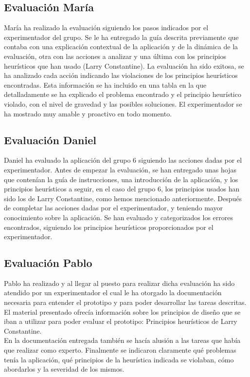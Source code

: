 \subsection{Evaluación María}
María ha realizado la evaluación siguiendo los pasos indicados por el experimentador del grupo. Se le ha entregado la guía descrita previamente que contaba con 
una explicación contextual de la aplicación y de la dinámica de la evaluación, otra con las acciones a analizar y una última con los principios heurísticos que han 
usado (Larry Constantine). La evaluación ha sido exitosa, se ha analizado cada acción indicando las violaciones de los principios heurísticos encontradas. 
Esta información se ha incluido en una tabla en la que detalladamente se ha explicado el problema encontrado y el principio heurístico violado, con el nivel de
gravedad y las posibles soluciones. El experimentador se ha mostrado muy amable y proactivo en todo momento.

\subsection{Evaluación Daniel}
Daniel ha evaluado la aplicación del grupo 6 siguiendo las acciones dadas por el experimentador. Antes de empezar la evaluación, se han entregado unas hojas que 
contenían la guía de instrucciones, una introducción de la aplicación, y los principios heurísticos a seguir, en el caso del grupo 6, los principios usados han sido 
los de Larry Constantine, como hemos mencionado anteriormente. Después de completar las acciones dadas por el experimentador, y teniendo mayor conocimiento sobre 
la aplicación. Se han evaluado y categorizados los errores encontrados, siguiendo los principios heurísticos proporcionados por el experimentador.

\subsection{Evaluación Pablo}
Pablo ha realizado y al llegar al puesto para realizar dicha evaluación ha sido atendido por un experimentador el cual le ha otorgado la documentación necesaria para 
entender el prototipo y para poder desarrollar las tareas descritas. El material presentado ofrecía información sobre los principios de diseño que se iban a utilizar
para poder evaluar el prototipo: Principios heurísticos de Larry Constantine. \\
En la documentación entregada también se hacía alusión a las tareas que había que realizar como experto. Finalmente se indicaron claramente qué problemas tenía la 
aplicación, qué principios de la heurística indicada se violaban, cómo abordarlos y la severidad de los mismos.

